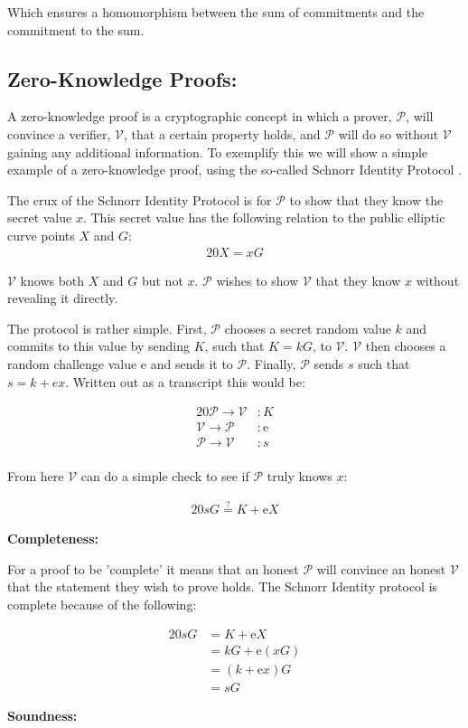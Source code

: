 \documentclass{article}
\newcommand{\eq}[1]{\begin{alignat*}{20}#1\end{alignat*}}
\newcommand{\ran}[1]{\mathrm{#1}}
\newcommand{\V}{\mathcal{V}}
\renewcommand{\P}{\mathcal{P}}
\begin{document}
Which ensures a homomorphism between the sum of commitments and the
commitment to the sum.

\subsection{Zero-Knowledge Proofs:}\label{zero-knowledge-proofs}

A zero-knowledge proof is a cryptographic concept in which a prover,
$\P$, will convince a verifier, $\V$, that a certain property
holds, and $\P$ will do so without $\V$ gaining any additional
information. To exemplify this we will show a simple example of
a zero-knowledge proof, using the so-called Schnorr Identity Protocol
\cite{zkdocs-schnorr}.

The crux of the Schnorr Identity Protocol is for $\P$ to show that
they know the secret value $x$. This secret value has the following
relation to the public elliptic curve points $X$ and $G$:
\eq{
	X = xG
}

$\V$ knows both $X$ and $G$ but not $x$. $\P$ wishes to show $\V$ that 
they know $x$ without revealing it directly.

The protocol is rather simple. First, $\P$ chooses a secret random
value $k$ and commits to this value by sending $K$, such that $K =
kG$, to $\V$. $\V$ then chooses a random challenge value $\ran{e}$
and sends it to $\P$. Finally, $\P$ sends $s$ such that $s = k +
ex$. Written out as a transcript this would be:

\eq{
	\P \rightarrow \V &: K \\
	\V \rightarrow \P &: \ran{e} \\
	\P \rightarrow \V &: s \\
}

From here $\V$ can do a simple check to see if $\P$ truly knows $x$:

\eq{
	sG \stackrel{?}{=} K + \ran{e}X
}

\textbf{Completeness:}

For a proof to be 'complete' it means that an honest $\P$ will convince
an honest $\V$ that the statement they wish to prove holds. The Schnorr 
Identity protocol is complete because of the following:

\eq{
	sG &= K + \ran{e}X \\
	   &= kG + \ran{e}(xG) \\
	   &= (k + \ran{e}x)G \\
	   &= sG
}

\textbf{Soundness:}
\end{document}

